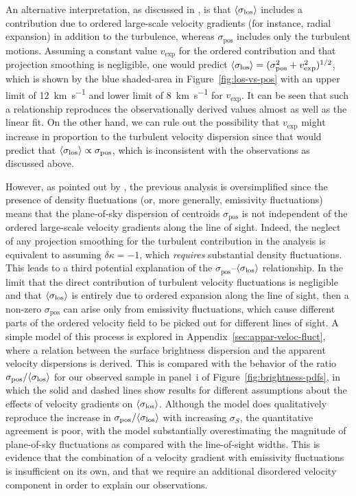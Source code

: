 \documentclass[fleqn,usenatbib, useAMS, a4paper]{mnras}
\newcommand\pos{\ensuremath{_{\mathrm{pos}}}}
\begin{document}
\newcommand\vexp{\ensuremath{v_{\text{exp}}}}
An alternative interpretation,
as discussed in \citet{2011MNRAS.413..705L},
is that \(\langle\sigma_{\mathrm{los}}\rangle\) includes a contribution due to
ordered large-scale velocity gradients
(for instance, radial expansion)
in addition to the turbulence,
whereas \(\sigma\pos\) includes only the turbulent motions. 
Assuming a constant value \vexp{} for the ordered contribution
and that projection smoothing is negligible,
one would predict \(\siglosm = (\sigma\pos^2 + \vexp^2)^{1/2}\),
which is shown by the blue shaded-area in Figure~\ref{fig:los-vs-pos}
with an upper limit of \SI{12}{km.s^{-1}} and lower limit of \SI{8}{km.s^{-1}} for \(\vexp\).
It can be seen that such a relationship reproduces the 
observationally derived values almost as well as the linear fit.
On the other hand, we can rule out the possibility that
\vexp{} might increase in proportion to the turbulent velocity dispersion
since that would predict that \(\siglosm \propto \sigma\pos\),
which is inconsistent with the observations as discussed above.

However, as pointed out by \citet{arthur2016turbulence},
the previous analysis is oversimplified since the presence
of density fluctuations (or, more generally, emissivity fluctuations)
means that the plane-of-sky dispersion of centroids \(\sigma\pos\)
is not independent of the 
ordered large-scale velocity gradients along the line of sight.
Indeed, the neglect of any projection smoothing for the turbulent contribution
in the \citeauthor{2011MNRAS.413..705L} analysis is equivalent to
assuming \(\delta\kappa = -1\), which \emph{requires} substantial density fluctuations. 
This leads to a third potential explanation of the
\(\sigma\pos\)--\(\langle\sigma_{\mathrm{los}}\rangle\) relationship.
In the limit that the direct contribution of
turbulent velocity fluctuations is negligible
and that \(\langle\sigma_{\mathrm{los}}\rangle\) is entirely due to ordered expansion along the line of sight,
then a non-zero \(\sigma\pos\) can arise only from emissivity fluctuations,
which cause different parts of the ordered velocity field to be picked out
for different lines of sight.
A simple model of this process is explored in Appendix~\ref{sec:appar-veloc-fluct},
where a relation between the surface brightness dispersion and the apparent
velocity dispersions is derived.
This is compared with the behavior of the ratio
\(\sigma\pos / \siglosm\) for
our observed sample in panel~i of Figure~\ref{fig:brightness-pdfs},
in which the solid and dashed lines show results for different assumptions
about the effects of velocity gradients on \(\langle\sigma_{\mathrm{los}}\rangle\).
Although the model does qualitatively reproduce the increase
in \(\sigma\pos / \siglosm\) with increasing \(\sigma_S\), the quantitative agreement
is poor, with the model substantially overestimating the magnitude of
plane-of-sky fluctuations as compared with the line-of-sight widths.
This is evidence that the combination of a velocity gradient with
emissivity fluctuations is insufficient on its own,
and that we require an additional disordered velocity component
in order to explain our observations.
\end{document}
